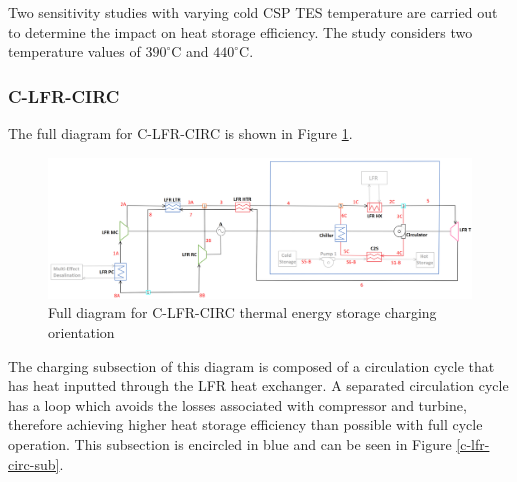 \begin{paracol}{2}
\linenumbers
\switchcolumn

Two sensitivity studies  with varying cold CSP TES temperature are carried out to determine the impact on heat storage efficiency. The study considers two temperature values of $390^{\circ}$C and $440^{\circ}$C.

\subsubsection{C-LFR-CIRC} 

The full diagram for C-LFR-CIRC is shown in Figure \ref{c-lfr-circ}.

\end{paracol}
\begin{figure}[H]
    \widefigure
    \includegraphics[width=\linewidth]{Definitions/c-lfr-circ.pdf}
    \caption{Full diagram for C-LFR-CIRC thermal energy storage charging orientation\label{c-lfr-circ}}
\end{figure}
\begin{paracol}{2}
\linenumbers
\switchcolumn

The charging subsection of this diagram is composed of a circulation cycle that has heat inputted through the LFR heat exchanger. A separated circulation cycle has a loop which avoids the losses associated with compressor and turbine, therefore achieving higher heat storage efficiency than possible with full cycle operation. This subsection is encircled in blue and can be seen in Figure \ref{c-lfr-circ-sub}.


\end{paracol}
